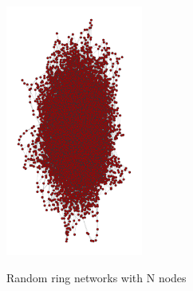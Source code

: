 \documentclass[a4paper]{article}
\theoremstyle{definition}
\begin{document}
\begin{figure}[H]
{    \label{fig:random-graph10000}
    \includegraphics[width=0.4\textwidth]{../graphs/random10000.pdf}
  }
  \hspace{1em}
  \caption{Random ring networks with N nodes}
  \label{fig:random-graphs}
\end{figure}

\newpage
\end{document}
